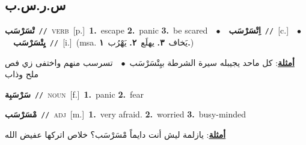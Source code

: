 \documentclass[10pt,a4paper,twoside]{article} %
\begin{document}
\begin{multicols}{2}
\vspace{-3mm}
\subsection*{\color{blue}\foreignlanguage{arabic}{س.ر.س.ب}\color{blue}{}} 

{\setlength\topsep{0pt}\textbf{\foreignlanguage{arabic}{تْسَرْسَب}}\ {\color{gray}\texttt{//}\color{black}}\ \textsc{verb}\ [p.]\ \textbf{1.}~escape  \textbf{2.}~panic  \textbf{3.}~be scared\ \ $\bullet$\ \ \setlength\topsep{0pt}\textbf{\foreignlanguage{arabic}{اِتْسَرْسَب}}\ {\color{gray}\texttt{//}\color{black}}\ [c.]\ \ $\bullet$\ \ \setlength\topsep{0pt}\textbf{\foreignlanguage{arabic}{يِتْسَرْسَب}}\ {\color{gray}\texttt{//}\color{black}}\ [i.]\ \color{gray}(msa. \foreignlanguage{arabic}{يَخاف}~\foreignlanguage{arabic}{\textbf{٣.}}  \foreignlanguage{arabic}{يهلَع}~\foreignlanguage{arabic}{\textbf{٢.}}  \foreignlanguage{arabic}{يَهْرُب}~\foreignlanguage{arabic}{\textbf{١.}})\color{black}\  \begin{flushright}\color{gray}\foreignlanguage{arabic}{\textbf{\underline{\foreignlanguage{arabic}{أمثلة}}}: كل ماحد يجيبله سيرة الشرطة بيِتْسَرْسَب\ $\bullet$\ \  تسرسب منهم واختفى زي فص ملح وذاب}\end{flushright}\color{black}} \vspace{2mm}

{\setlength\topsep{0pt}\textbf{\foreignlanguage{arabic}{سَرْسَبِة}}\ {\color{gray}\texttt{//}\color{black}}\ \textsc{noun}\ [f.]\ \textbf{1.}~panic  \textbf{2.}~fear\ } \vspace{2mm}

{\setlength\topsep{0pt}\textbf{\foreignlanguage{arabic}{مْسَرْسَب}}\ {\color{gray}\texttt{//}\color{black}}\ \textsc{adj}\ [m.]\ \textbf{1.}~very afraid.  \textbf{2.}~worried  \textbf{3.}~busy-minded\  \begin{flushright}\color{gray}\foreignlanguage{arabic}{\textbf{\underline{\foreignlanguage{arabic}{أمثلة}}}: يازلمة ليش أنت دايماً مْسَرْسَب؟ خلاص اتركها عفيض الله}\end{flushright}\color{black}} \vspace{2mm}


\end{multicols}
\end{document}
